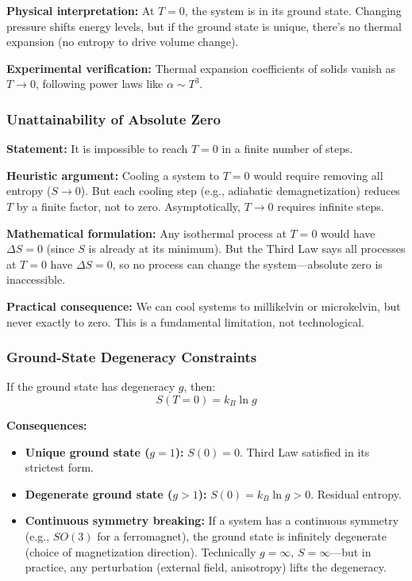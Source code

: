 \documentclass[9pt,twocoloumn]{article}
\begin{document}
\textbf{Physical interpretation:} At $T = 0$, the system is in its ground state. Changing pressure shifts energy levels, but if the ground state is unique, there's no thermal expansion (no entropy to drive volume change).

\textbf{Experimental verification:} Thermal expansion coefficients of solids vanish as $T \to 0$, following power laws like $\alpha \sim T^3$.

\subsubsection{Unattainability of Absolute Zero}

\textbf{Statement:} It is impossible to reach $T = 0$ in a finite number of steps.

\textbf{Heuristic argument:} Cooling a system to $T = 0$ would require removing all entropy ($S \to 0$). But each cooling step (e.g., adiabatic demagnetization) reduces $T$ by a finite factor, not to zero. Asymptotically, $T \to 0$ requires infinite steps.

\textbf{Mathematical formulation:} Any isothermal process at $T = 0$ would have $\Delta S = 0$ (since $S$ is already at its minimum). But the Third Law says all processes at $T = 0$ have $\Delta S = 0$, so no process can change the system—absolute zero is inaccessible.

\textbf{Practical consequence:} We can cool systems to millikelvin or microkelvin, but never exactly to zero. This is a fundamental limitation, not technological.

\subsubsection{Ground-State Degeneracy Constraints}

If the ground state has degeneracy $g$, then:
\begin{equation}
S(T=0) = k_B \ln g
\end{equation}

\textbf{Consequences:}
\begin{itemize}
    \item \textbf{Unique ground state ($g=1$):} $S(0) = 0$. Third Law satisfied in its strictest form.
    \item \textbf{Degenerate ground state ($g > 1$):} $S(0) = k_B \ln g > 0$. Residual entropy.
    \item \textbf{Continuous symmetry breaking:} If a system has a continuous symmetry (e.g., $SO(3)$ for a ferromagnet), the ground state is infinitely degenerate (choice of magnetization direction). Technically $g = \infty$, $S = \infty$—but in practice, any perturbation (external field, anisotropy) lifts the degeneracy.
\end{itemize}
\end{document}
